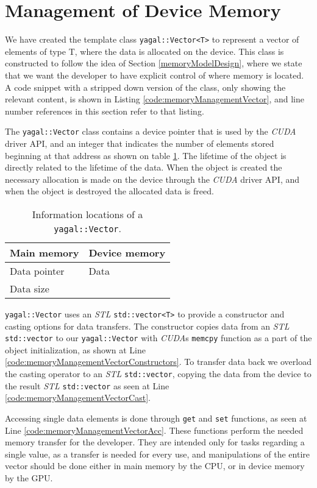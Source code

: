 \section{Management of Device Memory}
We have created the template class \texttt{yagal::Vector<T>} to represent a vector of elements of type T, where the data is allocated on the device. This class is constructed to follow the idea of Section \ref{memoryModelDesign}, where we state that we want the developer to have explicit control of where memory is located. A code snippet with a stripped down version of the class, only showing the relevant content, is shown in Listing \ref{code:memoryManagementVector}, and line number references in this section refer to that listing.

The \texttt{yagal::Vector} class contains a device pointer that is used by the \textit{CUDA} driver API, and an integer that indicates the number of elements stored beginning at that address as shown on table \ref{tab:vecMem}. The lifetime of the object is directly related to the lifetime of the data. When the object is created the necessary allocation is made on the device through the \textit{CUDA} driver API, and when the object is destroyed the allocated data is freed.

\begin{table}[H]
\center
\begin{tabular}{|l|l|}
\hline
Main memory & Device memory \\
\hline
Data pointer & Data \\
Data size & \\
\hline
\end{tabular}
\caption{Information locations of a \texttt{yagal::Vector}.}
\label{tab:vecMem}
\end{table}

\texttt{yagal::Vector} uses an \textit{STL} \texttt{std::vector<T>} to provide a constructor and casting options for data transfers. The constructor copies data from an \textit{STL} \texttt{std::vector} to our \texttt{yagal::Vector} with \textit{CUDA}s \texttt{memcpy} function as a part of the object initialization, as shown at Line \ref{code:memoryManagementVectorConstructors}. To transfer data back we overload the casting operator to an \textit{STL} \texttt{std::vector}, copying the data from the device to the result \textit{STL} \texttt{std::vector} as seen at Line \ref{code:memoryManagementVectorCast}.

Accessing single data elements is done through \texttt{get} and \texttt{set} functions, as seen at Line \ref{code:memoryManagementVectorAcc}. These functions perform the needed memory transfer for the developer. They are intended only for tasks regarding a single value, as a transfer is needed for every use, and manipulations of the entire vector should be done either in main memory by the CPU, or in device memory by the GPU.

